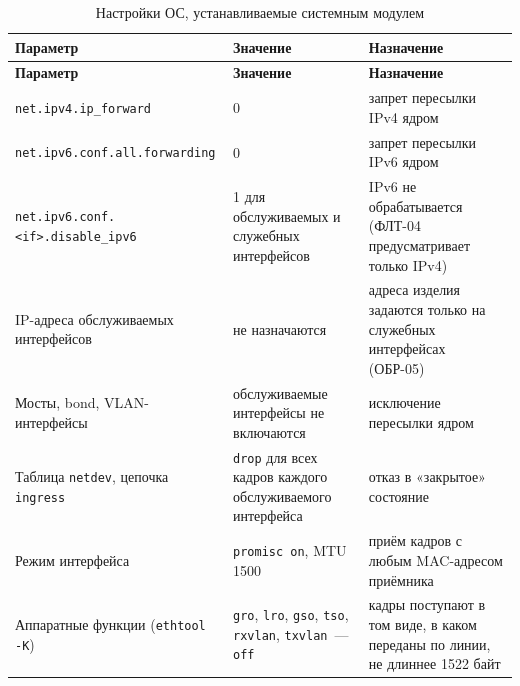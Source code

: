 \documentclass[12pt,a4paper,final]{article}
\begin{document}
{\small
\begin{longtable}{|L{5.4cm}|L{3.4cm}|L{5.3cm}|}
\caption{Настройки ОС, устанавливаемые системным модулем}\label{tab:os-settings}\\
\hline
\textbf{Параметр} & \textbf{Значение} & \textbf{Назначение}\\
\hline\endfirsthead
\hline
\textbf{Параметр} & \textbf{Значение} & \textbf{Назначение}\\
\hline\endhead
\texttt{net.ipv4.ip\_forward} & 0 & запрет пересылки IPv4 ядром\\ \hline
\texttt{net.\allowbreak ipv6.\allowbreak conf.\allowbreak all.\allowbreak forwarding} & 0 & запрет пересылки IPv6 ядром\\ \hline
\texttt{net.\allowbreak ipv6.\allowbreak conf.\allowbreak <if>.\allowbreak disable\_ipv6} & 1 для обслуживаемых и служебных интерфейсов & IPv6 не обрабатывается (ФЛТ-04 предусматривает только IPv4)\\ \hline
IP-адреса обслуживаемых интерфейсов & не назначаются & адреса изделия задаются только на служебных интерфейсах (ОБР-05)\\ \hline
Мосты, bond, VLAN-интерфейсы & обслуживаемые интерфейсы не включаются & исключение пересылки ядром\\ \hline
Таблица \texttt{netdev}, цепочка \texttt{ingress} & \texttt{drop} для всех кадров каждого обслуживаемого интерфейса & отказ в «закрытое» состояние\\ \hline
Режим интерфейса & \texttt{promisc on}, MTU 1500 & приём кадров с любым MAC-адресом приёмника\\ \hline
Аппаратные функции (\texttt{ethtool -K}) & \texttt{gro}, \texttt{lro}, \texttt{gso}, \texttt{tso}, \texttt{rxvlan}, \texttt{txvlan}~— \texttt{off} & кадры поступают в том виде, в каком переданы по линии, не длиннее 1522 байт\\ \hline
\end{longtable}
}
\end{document}
